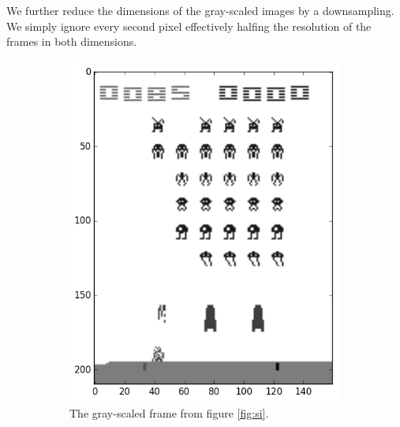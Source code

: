 \documentclass[11pt]{article}
\begin{document}
We further reduce the dimensions of the gray-scaled images by a downsampling.
We simply ignore every second pixel effectively halfing the resolution of the frames 
in both dimensions.
\begin{figure}[h!]
    \begin{subfigure}[t]{.5\textwidth}
        \centering
        \includegraphics[scale=0.35]{include/space_invaders_1_gray.png}
        \caption{The gray-scaled frame from figure \ref{fig:si}.}
        \label{fig:sig}
    \end{subfigure}
    \begin{subfigure}[t]{.5\textwidth}
        \centering

\end{subfigure}
\end{figure}
\end{document}
